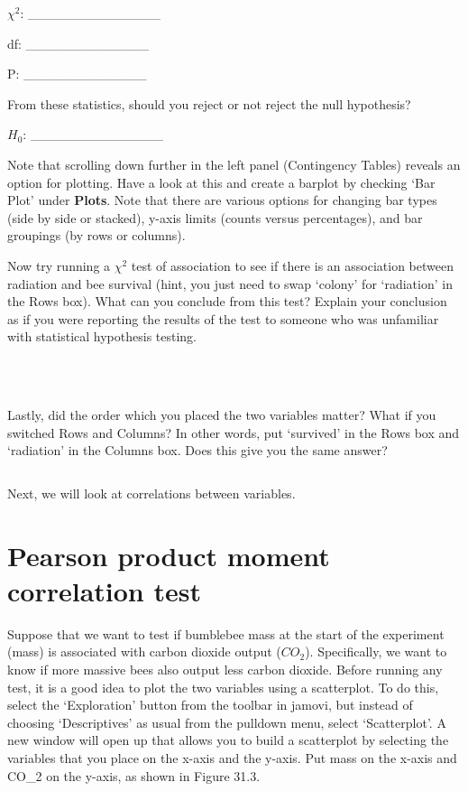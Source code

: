 \documentclass[
  openany]{scrbook}
\begin{document}
\(\chi^{2}\): \_\_\_\_\_\_\_\_\_\_\_\_\_\_

df: \_\_\_\_\_\_\_\_\_\_\_\_\_

P: \_\_\_\_\_\_\_\_\_\_\_\_\_

From these statistics, should you reject or not reject the null hypothesis?

\(H_{0}\): \_\_\_\_\_\_\_\_\_\_\_\_\_\_

Note that scrolling down further in the left panel (Contingency Tables) reveals an option for plotting.
Have a look at this and create a barplot by checking `Bar Plot' under \textbf{Plots}.
Note that there are various options for changing bar types (side by side or stacked), y-axis limits (counts versus percentages), and bar groupings (by rows or columns).

Now try running a \(\chi^{2}\) test of association to see if there is an association between radiation and bee survival (hint, you just need to swap `colony' for `radiation' in the Rows box).
What can you conclude from this test?
Explain your conclusion as if you were reporting the results of the test to someone who was unfamiliar with statistical hypothesis testing.

\begin{verbatim}



\end{verbatim}

Lastly, did the order which you placed the two variables matter?
What if you switched Rows and Columns?
In other words, put `survived' in the Rows box and `radiation' in the Columns box.
Does this give you the same answer?

\begin{verbatim}

\end{verbatim}

Next, we will look at correlations between variables.

\hypertarget{pearson-product-moment-correlation-test}{%
\section{Pearson product moment correlation test}\label{pearson-product-moment-correlation-test}}

Suppose that we want to test if bumblebee mass at the start of the experiment (mass) is associated with carbon dioxide output (\(CO_{2}\)).
Specifically, we want to know if more massive bees also output less carbon dioxide.
Before running any test, it is a good idea to plot the two variables using a scatterplot.
To do this, select the `Exploration' button from the toolbar in jamovi, but instead of choosing `Descriptives' as usual from the pulldown menu, select `Scatterplot'.
A new window will open up that allows you to build a scatterplot by selecting the variables that you place on the x-axis and the y-axis.
Put mass on the x-axis and CO\_2 on the y-axis, as shown in Figure 31.3.
\end{document}
